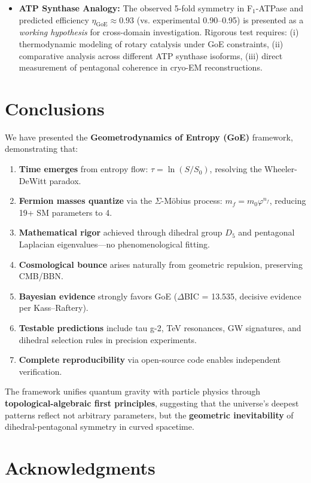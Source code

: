 \documentclass[12pt]{article}
\begin{document}
\begin{itemize}
\item \textbf{ATP Synthase Analogy:} The observed 5-fold symmetry in F$_1$-ATPase and predicted efficiency $\eta_{\text{GoE}} \approx 0.93$ (vs. experimental 0.90–0.95) is presented as a \emph{working hypothesis} for cross-domain investigation. Rigorous test requires: (i) thermodynamic modeling of rotary catalysis under GoE constraints, (ii) comparative analysis across different ATP synthase isoforms, (iii) direct measurement of pentagonal coherence in cryo-EM reconstructions.
\end{itemize}

\section{Conclusions}

We have presented the \textbf{Geometrodynamics of Entropy (GoE)} framework, demonstrating that:

\begin{enumerate}
\item \textbf{Time emerges} from entropy flow: $\tau = \ln(S/S_0)$, resolving the Wheeler-DeWitt paradox.
\item \textbf{Fermion masses quantize} via the $\Sigma$-M\"obius process: $m_f = m_0 \varphi^{n_f}$, reducing 19+ SM parameters to 4.
\item \textbf{Mathematical rigor} achieved through dihedral group $D_5$ and pentagonal Laplacian eigenvalues—no phenomenological fitting.
\item \textbf{Cosmological bounce} arises naturally from geometric repulsion, preserving CMB/BBN.
\item \textbf{Bayesian evidence} strongly favors GoE ($\Delta$BIC = 13.535, decisive evidence per Kass--Raftery).
\item \textbf{Testable predictions} include tau g-2, TeV resonances, GW signatures, and dihedral selection rules in precision experiments.
\item \textbf{Complete reproducibility} via open-source code enables independent verification.
\end{enumerate}

The framework unifies quantum gravity with particle physics through \textbf{topological-algebraic first principles}, suggesting that the universe's deepest patterns reflect not arbitrary parameters, but the \textbf{geometric inevitability} of dihedral-pentagonal symmetry in curved spacetime.

\section*{Acknowledgments}
\end{document}
